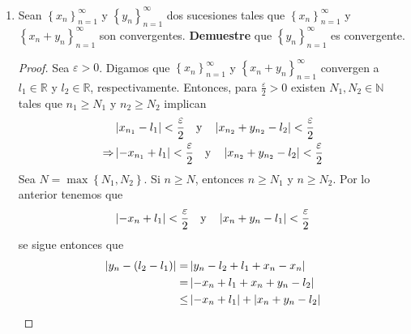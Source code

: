 \documentclass[12pt]{article}
\begin{document}
\begin{enumerate}
\begin{proof}
            En cualquier caso, se concluyó que si $n\geq N$, entonces
            \begin{equation*}
                \abs{x_n-l}<\varepsilon
            \end{equation*}
            Luego, por definición de límite se sigue que la sucesión $\left\{x_n\right\}_{n=1}^{\infty}$ también debe converger a $l$.
            \qed
        \end{proof}
    \item Sean $\left\{x_n\right\}_{n=1}^{\infty}$ y $\left\{y_n\right\}_{n=1}^{\infty}$ dos sucesiones tales que $\left\{x_n\right\}_{n=1}^{\infty}$ y $\left\{x_n+y_n\right\}_{n=1}^{\infty}$ son convergentes. \textbf{Demuestre} que $\left\{y_n\right\}_{n=1}^{\infty}$ es convergente.
    
    \begin{proof}
        Sea $\varepsilon>0$. Digamos que $\left\{x_n\right\}_{n=1}^{\infty}$ y $\left\{x_n+y_n\right\}_{n=1}^{\infty}$ convergen a $l_1\in\mathbb{R}$ y $l_2\in\mathbb{R}$, respectivamente. Entonces, para $\frac{\varepsilon}{2}>0$ existen $N_1,N_2\in\mathbb{N}$ tales que $n_1\geq N_1$ y $n_2\geq N_2$ implican
        \begin{equation*}
            \begin{split}
                &\left| x_{n_1}-l_1 \right|<\frac{\varepsilon}{2}\quad \textup{y}\quad \left| x_{n_2}+y_{n_2}-l_2 \right|<\frac{\varepsilon}{2}\\
                \Rightarrow&\left| -x_{n_1}+l_1 \right|<\frac{\varepsilon}{2}\quad \textup{y}\quad \left| x_{n_2}+y_{n_2}-l_2 \right|<\frac{\varepsilon}{2}\\
            \end{split}
        \end{equation*}
        Sea $N=\max\left\{N_1,N_2\right\}$. Si $n\geq N$, entonces $n\geq N_1$ y $n\geq N_2$. Por lo anterior tenemos que
        \begin{equation*}
            \left| -x_{n}+l_1 \right|<\frac{\varepsilon}{2}\quad \textup{y}\quad \left| x_{n}+y_{n}-l_1 \right|<\frac{\varepsilon}{2}
        \end{equation*}
        se sigue entonces que
        \begin{equation*}
            \begin{split}
                \abs{y_n-(l_2-l_1)}=&\abs{y_n-l_2+l_1+x_n-x_n}\\
                =&\abs{-x_n+l_1+x_n+y_n-l_2}\\
                \leq&\abs{-x_n+l_1}+\abs{x_n+y_n-l_2}\\

\end{split}
\end{equation*}
\end{proof}
\end{enumerate}
\end{document}
